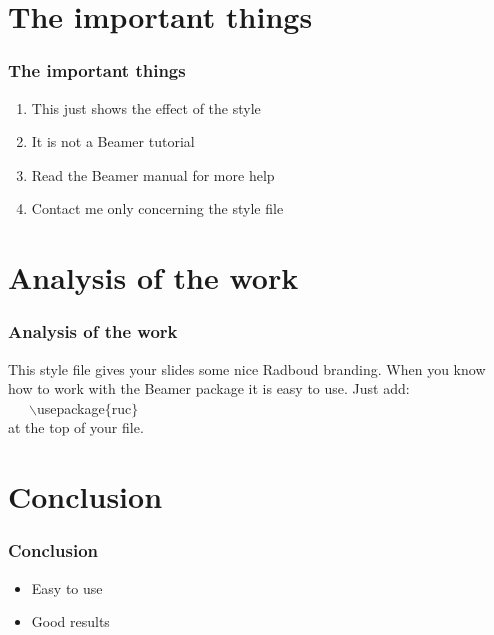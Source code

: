 \documentclass{beamer}
\begin{document}
\section{The important things}

\begin{frame}
  \frametitle{The important things}

  \begin{enumerate}
    \item This just shows the effect of the style
    \item It is not a Beamer tutorial
    \item Read the Beamer manual for more help
    \item Contact me only concerning the style file
  \end{enumerate}
\end{frame}

\section{Analysis of the work}

\begin{frame}
  \frametitle{Analysis of the work}

  This style file gives your slides some nice Radboud branding.
  When you know how to work with the Beamer package it is easy to use.
  Just add:\\ ~~~$\backslash$usepackage$\{$ruc$\}$ \\ at the top of your file.
\end{frame}

\section{Conclusion}

\begin{frame}
  \frametitle{Conclusion}

  \begin{itemize}
    \item Easy to use
    \item Good results
  \end{itemize}
\end{frame}
\end{document}
